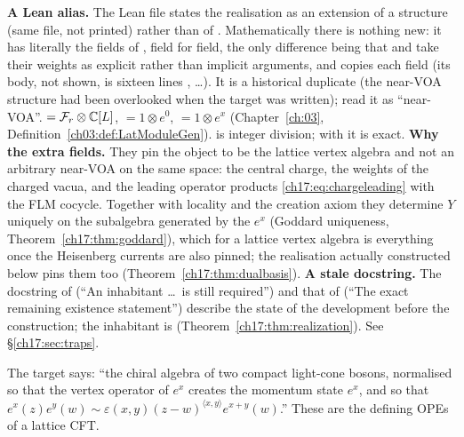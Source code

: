 \begin{dictionary}
\textbf{A Lean alias.} The Lean file states the realisation as an extension of a structure
 (same file, not printed) rather than of .
Mathematically there is nothing new: it has literally the fields of , field for field, the only
difference being that  and  take their weights as explicit rather than
implicit arguments, and  copies each field (its body, not shown, is sixteen lines
, …).  It is a historical duplicate (the near-VOA structure had been overlooked
when the target was written); read it as ``near-VOA''.   $=\mathcal{F}_r\otimes{\mathbb{C}}[L]$,
 $=1\otimes e^0$,  $=1\otimes e^x$ (Chapter~\ref{ch:03},
Definition~\ref{ch03:def:LatModuleGen}).   is integer division; with  it is exact.
\textbf{Why the extra fields.} They pin the object to be the lattice vertex algebra and not an arbitrary
near-VOA on the same space: the central charge, the weights of the charged vacua, and the leading
operator products \eqref{ch17:eq:chargeleading} with the FLM cocycle.  Together with locality and the
creation axiom they determine $Y$ uniquely on the subalgebra generated by the $e^x$ (Goddard uniqueness,
Theorem~\ref{ch17:thm:goddard}), which for a lattice vertex algebra is everything once the Heisenberg
currents are also pinned; the realisation actually constructed below pins them too
(Theorem~\ref{ch17:thm:dualbasis}).
\textbf{A stale docstring.} The docstring of  (``An inhabitant \dots\ is still
required'') and that of  (``The exact remaining existence statement'') describe
the state of the development before the construction; the inhabitant is
 (Theorem~\ref{ch17:thm:realization}).  See \S\ref{ch17:sec:traps}.
\end{dictionary}

\begin{physics}
The target says: ``the chiral algebra of two compact light-cone bosons, normalised so that the vertex
operator of $e^x$ creates the momentum state $e^x$, and so that $e^x(z)e^y(w)\sim\varepsilon(x,y)(z-w)^{\langle x,y\rangle}e^{x+y}(w)$.''
These are the defining OPEs of a lattice CFT.
\end{physics}

